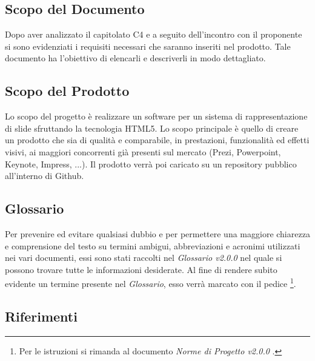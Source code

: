 \subsection{Scopo del Documento}
Dopo aver analizzato il capitolato C4 e a seguito dell'incontro con il proponente si sono evidenziati i requisiti
necessari che saranno inseriti nel prodotto. Tale documento ha l'obiettivo di elencarli e descriverli in modo dettagliato.

\subsection{Scopo del Prodotto}
Lo scopo del progetto è realizzare un software per un sistema di rappresentazione di \gls{slide} sfruttando la tecnologia \gls{HTML5}.
Lo scopo principale è quello di creare un prodotto che sia di qualità e comparabile, in prestazioni, funzionalità ed 
effetti visivi, ai maggiori concorrenti già presenti sul mercato (Prezi, Powerpoint, Keynote, Impress, ...).
Il prodotto verrà poi caricato su un \gls{repository} pubblico all'interno di \gls{Github}.

\subsection{Glossario}
Per prevenire ed evitare qualsiasi dubbio e per permettere una maggiore chiarezza e comprensione del testo su termini ambigui, abbreviazioni e acronimi utilizzati nei vari documenti, essi sono stati raccolti nel \textit{Glossario v2.0.0} nel quale si possono trovare tutte le informazioni desiderate.
Al fine di rendere subito evidente un termine presente nel \textit{Glossario}, esso verrà marcato con il pedice \G\footnote{Per le istruzioni si rimanda al documento \textit{Norme di Progetto v2.0.0} .}.

\subsection{Riferimenti}
